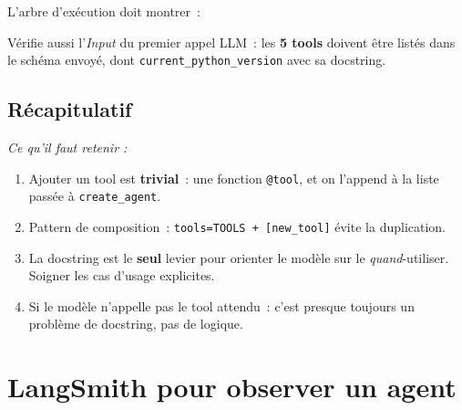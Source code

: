 \documentclass[11pt,a4paper]{article}
\begin{document}
L'arbre d'exécution doit montrer~:

\begin{center}
\end{center}

Vérifie aussi l'\emph{Input} du premier appel LLM~: les \textbf{5 tools}
doivent être listés dans le schéma envoyé, dont \texttt{current\_python\_version}
avec sa docstring.

\subsection*{Récapitulatif}
{\itshape\sloppy
\textit{Ce qu'il faut retenir :}
\begin{enumerate}[leftmargin=*]
  \item Ajouter un tool est \textbf{trivial}~: une fonction
        \texttt{@tool}, et on l'append à la liste passée à
        \texttt{create\_agent}.
  \item Pattern de composition~: \texttt{tools=TOOLS + [new\_tool]} évite
        la duplication.
  \item La docstring est le \textbf{seul} levier pour orienter le modèle
        sur le \emph{quand}-utiliser. Soigner les cas d'usage explicites.
  \item Si le modèle n'appelle pas le tool attendu~: c'est presque
        toujours un problème de docstring, pas de logique.
\end{enumerate}
\par}

\section{LangSmith pour observer un agent}
\end{document}
